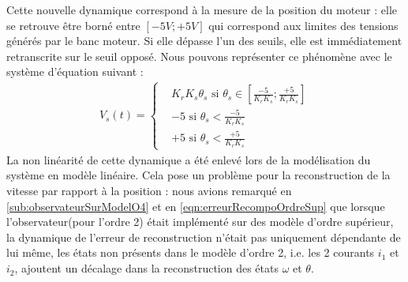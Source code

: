 			
		Cette nouvelle dynamique correspond à la mesure de la position du moteur : elle se retrouve être borné entre $[-5V; +5V]$ qui correspond aux limites des tensions générés par le banc moteur. Si elle dépasse l'un des seuils, elle est immédiatement retranscrite sur le seuil opposé. Nous pouvons représenter ce phénomène avec le système d'équation suivant :
		\begin{align*}
		V_s(t) = \left\lbrace \begin{aligned}
		&K_rK_s\theta_s \text{ si } \theta_s \in \left[\frac{-5}{K_rK_s}; \frac{+5}{K_rK_s}\right]\\
		&-5 \text{ si } \theta_s < \frac{-5}{K_rK_s}\\
		&+5 \text{ si } \theta_s < \frac{+5}{K_rK_s}
		\end{aligned}
		\right.		
		\end{align*}
		La non linéarité de cette dynamique a été enlevé lors de la modélisation du système en modèle linéaire. Cela pose un problème pour la reconstruction de la vitesse par rapport à la position : nous avions remarqué en \ref{sub:observateurSurModelO4} et en \ref{eqn:erreurRecompoOrdreSup} que lorsque l'observateur(pour l'ordre 2) était implémenté sur des modèle d'ordre supérieur, la dynamique de l'erreur de reconstruction n'était pas uniquement dépendante de lui même, les états non présents dans le modèle d'ordre 2, i.e. les 2 courants $i_1$ et $i_2$, ajoutent un décalage dans la reconstruction des états $\omega$ et $\theta$.
		

